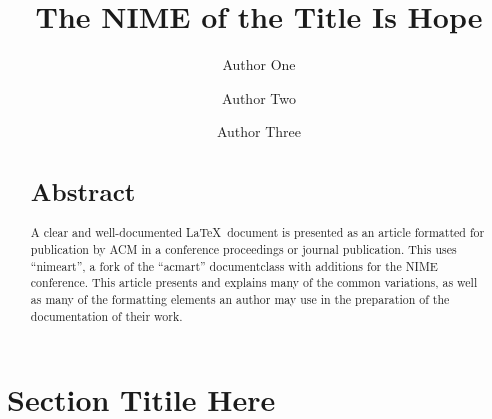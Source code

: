 \documentclass[acmsmall]{nimeart}
\begin{document}
\title{The NIME of the Title Is Hope}

\author{Author One}

\author{Author Two}

\author{Author Three}

\begin{abstract}
  \section*{Abstract}%
  A clear and well-documented \LaTeX\ document is presented as an
  article formatted for publication by ACM in a conference proceedings
  or journal publication. This uses ``nimeart'', a fork of the ``acmart''
  documentclass with additions for the NIME conference. This
  article presents and explains many of the common variations, as well
  as many of the formatting elements an author may use in the
  preparation of the documentation of their work.
\end{abstract}

\renewcommand{\shortauthors}{First Author's Surname et al.}


\maketitle

\section{Section Titile Here}
\end{document}
